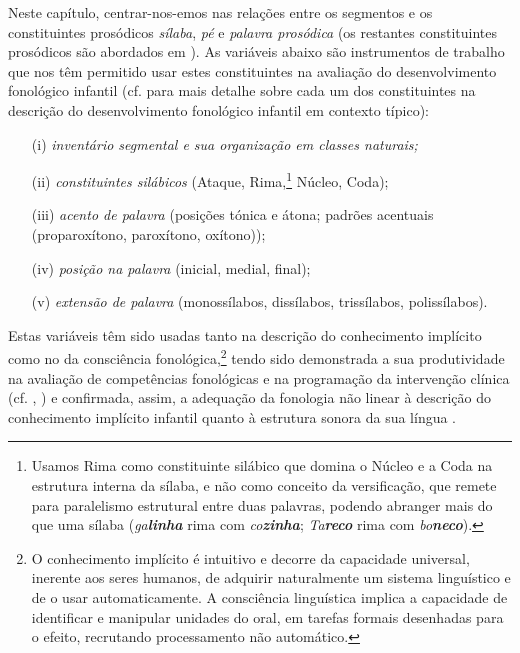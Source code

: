 \documentclass[output=paper,colorlinks,citecolor=brown,booklanguage=portuguese]{langscibook}
\begin{document}
Neste capítulo, centrar-nos-emos nas relações entre os segmentos e os constituintes prosódicos \emph{sílaba}, \emph{pé} e \emph{palavra prosódica} (os restantes constituintes prosódicos são abordados em ). As variáveis abaixo são instrumentos de trabalho que nos têm permitido usar estes constituintes na avaliação do desenvolvimento fonológico infantil (cf. \citealp{Freitas2017, Matzenauer2017, Santos2017} para mais detalhe sobre cada um dos constituintes na descrição do desenvolvimento fonológico infantil em contexto típico):


\begin{itemize}[align=left]
    \item [(i)] \emph{inventário segmental e sua organização em classes naturais;}
    \item[(ii)] \emph{constituintes silábicos} (Ataque, Rima,\footnote{Usamos Rima como constituinte silábico que domina o Núcleo e a Coda na estrutura interna da sílaba, e não como conceito da versificação, que remete para paralelismo estrutural entre duas palavras, podendo abranger mais do que uma sílaba (\emph{ga\textbf{linha}} rima com \emph{co\textbf{zinha}}; \emph{Ta\textbf{reco}} rima com \emph{bo\textbf{neco}}).} Núcleo, Coda);
    \item[(iii)] \emph{acento de palavra} (posições tónica e átona; padrões acentuais (proparoxítono, paroxítono, oxítono));
    \item[(iv)] \emph{posição na palavra} (inicial, medial, final);
    \item[(v)] \emph{extensão de palavra} (monossílabos, dissílabos, trissílabos, polissílabos).
\end{itemize}

Estas variáveis têm sido usadas tanto na descrição do conhecimento implícito como no da consciência fonológica,\footnote{O conhecimento implícito é intuitivo e decorre da capacidade universal, inerente aos seres humanos, de adquirir naturalmente um sistema linguístico e de o usar automaticamente. A consciência linguística implica a capacidade de identificar e manipular unidades do oral, em tarefas formais desenhadas para o efeito, recrutando processamento não automático.} tendo sido demonstrada a sua produtividade na avaliação de competências fonológicas e na programação da intervenção clínica (cf. , ) e confirmada, assim, a adequação da fonologia não linear à descrição do conhecimento implícito infantil quanto à estrutura sonora da sua língua \citep{Bernhardt2000}. 
\end{document}

